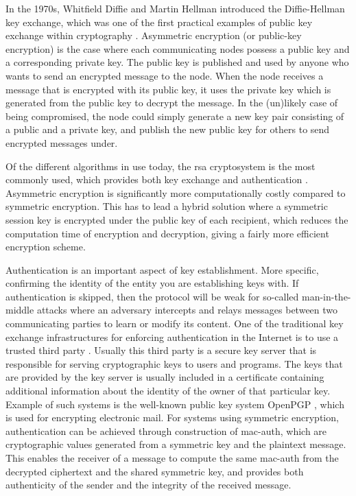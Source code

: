 In the 1970s, Whitfield Diffie and Martin Hellman introduced the Diffie-Hellman key exchange, which was one of the first practical examples of public key exchange within cryptography \cite{diffie1976new}.  Asymmetric encryption (or public-key encryption) is the case where each communicating nodes possess a public key and a corresponding private key. The public key is published and used by anyone who wants to send an encrypted message to the node. When the node receives a message that is encrypted with its public key, it uses the private key which is generated from the public key to decrypt the message. In the (un)likely case of being compromised, the node could simply generate a new key pair consisting of a public and a private key, and publish the new public key for others to send encrypted messages under.

Of the different algorithms in use today, the \gls{rsa} cryptosystem is the most commonly used, which provides both key exchange and authentication \cite{wander2005energy}. Asymmetric encryption is significantly more computationally costly compared to symmetric encryption. This has to lead a hybrid solution where a symmetric session key is encrypted under the public key of each recipient, which reduces the computation time of encryption and decryption, giving a fairly more efficient encryption scheme.



Authentication is an important aspect of key establishment. More specific, confirming the identity of the entity you are establishing keys with. If authentication is skipped, then the protocol will be weak for so-called man-in-the-middle attacks where an adversary intercepts and relays messages between two communicating parties to learn or modify its content. One of the traditional key exchange infrastructures for enforcing authentication in the Internet is to use a trusted third party \cite{maurer1996modelling}. Usually this third party is a secure key server that is responsible for serving cryptographic keys to users and programs. The keys that are provided by the key server is usually included in a certificate containing additional information about the identity of the owner of that particular key. Example of such systems is the well-known public key system OpenPGP \cite{openpgp}, which is used for encrypting electronic mail. For systems using symmetric encryption, authentication can be achieved through construction of \gls{mac-auth}, which are cryptographic values generated from a symmetric key and the plaintext message. This enables the receiver of a message to compute the same \gls{mac-auth} from the decrypted ciphertext and the shared symmetric key, and provides both authenticity of the sender and the integrity of the received message.


